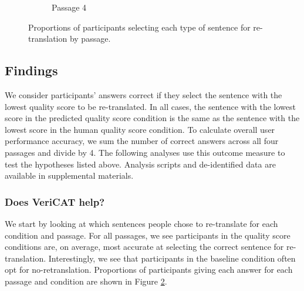 \begin{figure}
\begin{subfigure}[t]{0.45\textwidth}
{\begin{bchart}[step=.25,max=1,width=\linewidth]
        \bcskip{6pt}
        
        
        \end{bchart}}
        \caption{Passage 4} 
        \label{fig:exp_p4_prop_answers}
    \end{subfigure}
    
    \caption{Proportions of participants selecting each type of sentence for re-translation by passage.}
    \label{fig:exp_prop_answers}

\end{figure}

\subsection{Findings}

We consider participants' answers correct if they select the sentence with the lowest quality score to be re-translated. In all cases, the sentence with the lowest score in the predicted quality score condition is the same as the sentence with the lowest score in the human quality score condition. To calculate overall user performance accuracy, we sum the number of correct answers across all four passages and divide by 4. The following analyses use this outcome measure to test the hypotheses listed above. Analysis scripts and de-identified data are available in supplemental materials. 

\subsubsection{\textbf{Does VeriCAT help?}}

We start by looking at which sentences people chose to re-translate for each condition and passage. For all passages, we see participants in the quality score conditions are, on average, most accurate at selecting the correct sentence for re-translation. Interestingly, we see that participants in the baseline condition often opt for no-retranslation. Proportions of participants giving each answer for each passage and condition are shown in Figure \ref{fig:exp_prop_answers}.

